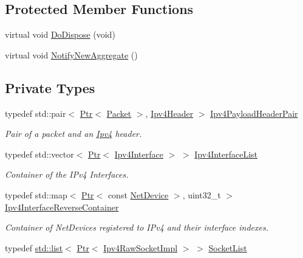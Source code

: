 \subsection*{Protected Member Functions}
\begin{DoxyCompactItemize}
\item 
virtual void \hyperlink{classns3_1_1Ipv4L3Protocol_ac8a748f7de27c60d87bbda8b10377f53}{Do\+Dispose} (void)
\item 
virtual void \hyperlink{classns3_1_1Ipv4L3Protocol_a41c7e4fc5a8dba55e9708df7cef9b9c7}{Notify\+New\+Aggregate} ()
\end{DoxyCompactItemize}
\subsection*{Private Types}
\begin{DoxyCompactItemize}
\item 
typedef std\+::pair$<$ \hyperlink{classns3_1_1Ptr}{Ptr}$<$ \hyperlink{classns3_1_1Packet}{Packet} $>$, \hyperlink{classns3_1_1Ipv4Header}{Ipv4\+Header} $>$ \hyperlink{classns3_1_1Ipv4L3Protocol_a2bf61de1f7739b9ce8b1dac10fb14b31}{Ipv4\+Payload\+Header\+Pair}
\begin{DoxyCompactList}\small\item\em Pair of a packet and an \hyperlink{classns3_1_1Ipv4}{Ipv4} header. \end{DoxyCompactList}\item 
typedef std\+::vector$<$ \hyperlink{classns3_1_1Ptr}{Ptr}$<$ \hyperlink{classns3_1_1Ipv4Interface}{Ipv4\+Interface} $>$ $>$ \hyperlink{classns3_1_1Ipv4L3Protocol_ada31b7e1708bfe1fb99a44f5c4f3271f}{Ipv4\+Interface\+List}
\begin{DoxyCompactList}\small\item\em Container of the I\+Pv4 Interfaces. \end{DoxyCompactList}\item 
typedef std\+::map$<$ \hyperlink{classns3_1_1Ptr}{Ptr}$<$ const \hyperlink{classns3_1_1NetDevice}{Net\+Device} $>$, uint32\+\_\+t $>$ \hyperlink{classns3_1_1Ipv4L3Protocol_a6fdb18e99c2052467dcb9079673f9764}{Ipv4\+Interface\+Reverse\+Container}
\begin{DoxyCompactList}\small\item\em Container of Net\+Devices registered to I\+Pv4 and their interface indexes. \end{DoxyCompactList}\item 
typedef \hyperlink{openflow-interface_8h_afd9bcfa176617760671b67580f536fa7}{std\+::list}$<$ \hyperlink{classns3_1_1Ptr}{Ptr}$<$ \hyperlink{classns3_1_1Ipv4RawSocketImpl}{Ipv4\+Raw\+Socket\+Impl} $>$ $>$ \hyperlink{classns3_1_1Ipv4L3Protocol_a3dd6ac663f7c8ccd87886bc864892dda}{Socket\+List}

\end{DoxyCompactItemize}
